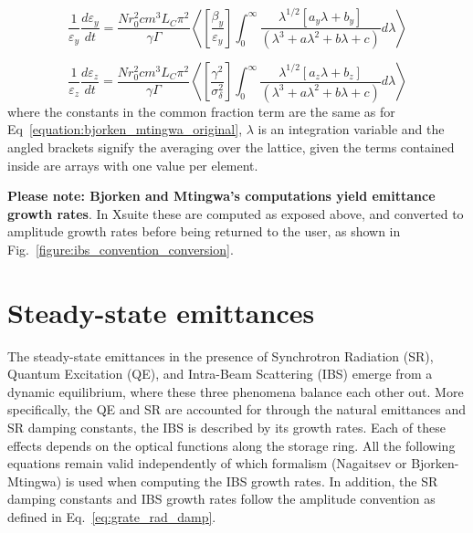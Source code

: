 \begin{equation}
    \boxed{\frac{1}{\varepsilon_y} \frac{d \varepsilon_y}{dt} = \frac{N r_0^{2} c m^3 L_C \pi^2}{\gamma \Gamma} \left< \left[\frac{\beta_y}{\varepsilon_y}\right] \int_0^{\infty} \frac{\lambda^{1/2} \left[a_y \lambda + b_y\right]}{\left(\lambda^3 + a \lambda^2 + b \lambda + c\right)} d \lambda \right>}
    \label{equation:bm_ty}
\end{equation}

\begin{equation}
    \boxed{\frac{1}{\varepsilon_z} \frac{d \varepsilon_z}{dt} = \frac{N r_0^{2} c m^3 L_C \pi^2}{\gamma \Gamma} \left< \left[\frac{\gamma^2}{\sigma_{\delta}^{2}}\right] \int_0^{\infty} \frac{\lambda^{1/2} \left[a_z \lambda + b_z\right]}{\left(\lambda^3 + a \lambda^2 + b \lambda + c\right)} d \lambda \right>}
    \label{equation:bm_tz}
\end{equation}
where the constants in the common fraction term are the same as for Eq~\eqref{equation:bjorken_mtingwa_original}, \(\lambda\) is an integration variable and the angled brackets signify the averaging over the lattice, given the terms contained inside are arrays with one value per element.
\newline

\textbf{Please note: Bjorken and Mtingwa's computations yield emittance growth rates}.
In Xsuite these are computed as exposed above, and converted to amplitude growth rates before being returned to the user, as shown in Fig.~\ref{figure:ibs_convention_conversion}.

\section{Steady-state emittances}
\label{subsection:steady-state_emittances}

The steady-state emittances in the presence of Synchrotron Radiation (SR), Quantum Excitation (QE), and Intra-Beam Scattering (IBS) emerge from a dynamic equilibrium, where these three phenomena balance each other out. More specifically, the QE and SR are accounted for through the natural emittances and SR damping constants, the IBS is described by its growth rates.
Each of these effects depends on the optical functions along the storage ring.
All the following equations remain valid independently of which formalism (Nagaitsev or Bjorken-Mtingwa) is used when computing the IBS growth rates. In addition, the SR damping constants and IBS growth rates follow the amplitude convention as defined in Eq.~\eqref{eq:grate_rad_damp}.

